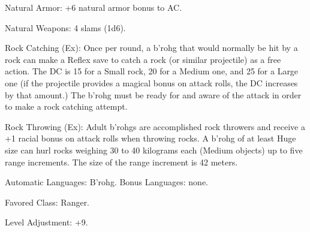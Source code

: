 \begin{itemize*}
    \item Natural Armor: +6 natural armor bonus to AC.
    \item Natural Weapons: 4 slams (1d6).
    \item Rock Catching (Ex): Once per round, a b'rohg that would normally be hit by a rock can make a Reflex save to catch a rock (or similar projectile) as a free action. The DC is 15 for a Small rock, 20 for a Medium one, and 25 for a Large one (if the projectile provides a magical bonus on attack rolls, the DC increases by that amount.) The b'rohg must be ready for and aware of the attack in order to make a rock catching attempt.
    \item Rock Throwing (Ex): Adult b'rohgs are accomplished rock throwers and receive a +1 racial bonus on attack rolls when throwing rocks. A b'rohg of at least Huge size can hurl rocks weighing 30 to 40 kilograms each (Medium objects) up to five range increments. The size of the range increment is 42 meters.
    \item Automatic Languages: B'rohg. Bonus Languages: none.
    \item Favored Class: Ranger.
    \item Level Adjustment: +9.
\end{itemize*}
